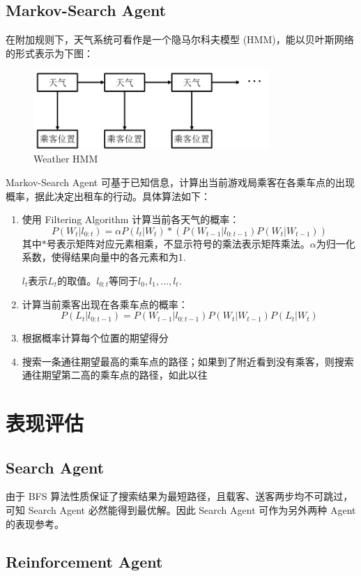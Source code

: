 \documentclass{article}
\begin{document}
\begin{CJK}{UTF8}{gbsn}
\subsection{Markov-Search Agent}
在附加规则下，天气系统可看作是一个隐马尔科夫模型 (HMM)，能以贝叶斯网络的形式表示为下图：

\begin{figure}[htbp]
  \centering
  \includegraphics[width=9cm,height=3cm]{images/1.png}
  \caption{Weather HMM}
\end{figure}
Markov-Search Agent 可基于已知信息，计算出当前游戏局乘客在各乘车点的出现概率，据此决定出租车的行动。具体算法如下：
\begin{enumerate}
  \item 使用 Filtering Algorithm 计算当前各天气的概率：
$$P(W_t|l_{0:t})=\alpha P(l_t|W_t)*(P(W_{t-1}|l_{0:t-1})P(W_t|W_{t-1}))$$
其中$*$号表示矩阵对应元素相乘，不显示符号的乘法表示矩阵乘法。$\alpha$为归一化系数，使得结果向量中的各元素和为1. 

$l_t$表示$L_t$的取值。$l_{0:t}$等同于$l_0,l_1,\dots,l_t$.
  \item 计算当前乘客出现在各乘车点的概率：
$$P(L_t|l_{0:t-1})=P(W_{t-1}|l_{0:t-1})P(W_t|W_{t-1})P(L_t|W_t)$$
  \item 根据概率计算每个位置的期望得分
  \item 搜索一条通往期望最高的乘车点的路径；如果到了附近看到没有乘客，则搜索通往期望第二高的乘车点的路径，如此以往
\end{enumerate}

\section{表现评估}
\subsection{Search Agent}
由于 BFS 算法性质保证了搜索结果为最短路径，且载客、送客两步均不可跳过，可知 Search Agent 必然能得到最优解。因此 Search Agent 可作为另外两种 Agent 的表现参考。

\subsection{Reinforcement Agent}

\end{CJK}
\end{document}
